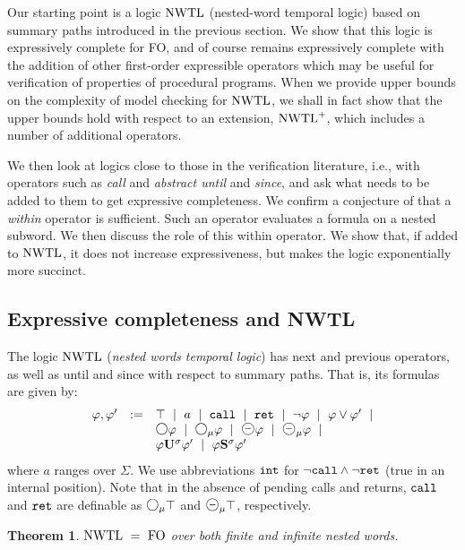 \documentclass{LMCS}
\newcommand{\M}{{\mu}}
\newcommand{\dm}{\Diamond}
\newcommand{\U}{{\mathbf U}}
\renewcommand{\S}{{\mathbf S}}
\newcommand{\next}{\text{\raisebox{1pt}{$\bigcirc$}}}
\newcommand{\FO}{{\rm FO}}
\renewcommand{\phi}{\varphi}
\theoremstyle{plain}
\newtheorem{theorem}{Theorem}[section]
\theoremstyle{definition}
\newcommand{\ppath}{\sigma} \newcommand{\Ul}{\U}
\newcommand{\Up}{\U^\ppath}
\newcommand{\Sp}{\S^\ppath}
\newcommand{\prev}{{\text{\Large $\mathbf{\circleddash}$}}}
\newcommand{\retr}{\mathit{ret}}
\newcommand{\nwtlp}{\nwtl^+}
\newcommand{\intt}{{\tt int}}
\newcommand{\rett}{{\tt ret}}
\newcommand{\call}{{\tt call}}
\renewcommand{\retr}{\rett}
\newcommand{\dmm}{\dm_{\M}}
\newcommand{\dmminus}{\dm^-}
\newcommand{\dmmminus}{\dm_{\M}^-}
\renewcommand{\dm}{\next}
\renewcommand{\dmminus}{\prev}
\renewcommand{\dmm}{\dm_\M}
\renewcommand{\dmmminus}{\dmminus_{\M}}
\begin{document}
Our starting point is a logic $\text{\rm NWTL}$ (nested-word temporal logic) based
on summary paths introduced in the previous section. We show that this
logic is expressively complete for FO, and of course remains expressively
complete with the addition of other first-order expressible operators
which may be  useful for
verification of properties of procedural programs. 
When we provide upper bounds on the complexity of model checking
for $\text{\rm NWTL}$, we shall in fact show that the upper bounds hold
with respect to an extension, $\nwtlp$,  which includes
a number of additional operators.


We then look at logics close to those in the verification literature,
i.e., with operators such as {\em call} and {\em abstract until} and {\em since}, and ask
what needs to be added to them to get expressive completeness. We
confirm a conjecture of \cite{AEM04} that a {\em within} operator is
sufficient.  Such an operator evaluates a formula on a nested
subword.
We then discuss the role of this within operator. We show that, if
added to $\text{\rm NWTL}$, it does not increase expressiveness, but makes the
logic exponentially more succinct.

\subsection{Expressive completeness and NWTL}

The logic $\text{\rm NWTL}$ ({\em nested words temporal logic}) has next and
previous operators, as well as until and since with respect to summary
paths. That is, its formulas are given by:
$$
\begin{array}{rcl} 
  \phi,\phi' & := &  \top\ \mid\ a \ \mid\ \call\ \mid\ \retr\ \mid \ \neg \phi \ \mid \ \phi \vee \phi' \
  \mid \\ 
&& \dm \phi \ \mid \  \dmm \phi \ \mid \ \dmminus \phi \ \mid\
  \dmmminus \phi \ \mid\\
&& \phi \Up \phi'  \ \mid \   \phi\Sp\phi'
\end{array}
$$
where $a$ ranges over $\Sigma$. We use abbreviations
$\intt$ for $\neg\call\wedge\neg\rett$ (true in an internal
position). Note that in the absence of pending calls and returns,
$\call$ and $\rett$ are definable as $\dmm\top$ and $\dmmminus\top$,
respectively. 



\begin{theorem}
\label{nwtl-thm}
$\nwtl \ = \ \FO$ over both finite and infinite nested words.
\end{theorem}
\end{document}
